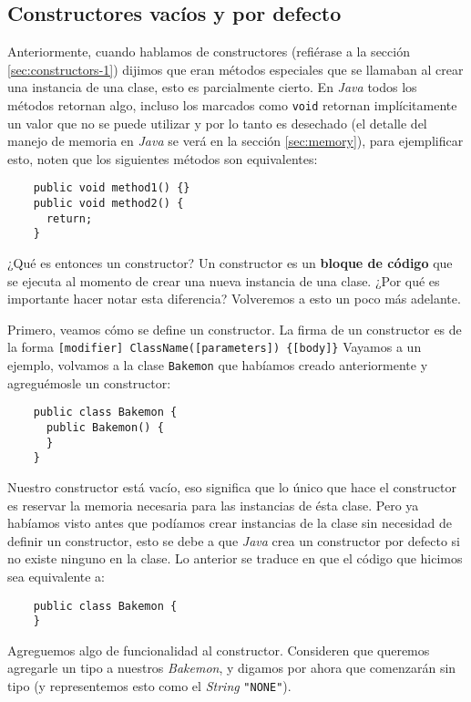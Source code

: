 \subsection{Constructores vacíos y por defecto}
  Anteriormente, cuando hablamos de constructores (refiérase a la sección 
  \ref{sec:constructors-1}) dijimos que eran métodos especiales que se llamaban al crear una 
  instancia de una clase, esto es parcialmente cierto.
  En \textit{Java} todos los métodos retornan algo, incluso los marcados como 
  \texttt{void} retornan implícitamente un valor que no se puede utilizar y por lo tanto
  es desechado (el detalle del manejo de memoria en \textit{Java} se verá en la sección 
  \ref{sec:memory}), para ejemplificar esto, noten que los siguientes métodos son equivalentes:
  
  \begin{verbatim}
    public void method1() {}
    public void method2() {
      return;
    }  
  \end{verbatim}

  ¿Qué es entonces un constructor?
  Un constructor es un \textbf{bloque de código} que se ejecuta al momento de crear una nueva 
  instancia de una clase.
  ¿Por qué es importante hacer notar esta diferencia?
  Volveremos a esto un poco más adelante.

  Primero, veamos cómo se define un constructor.
  La firma de un constructor es de la forma \texttt{[modifier] ClassName([parameters]) \{[body]\}}
  Vayamos a un ejemplo, volvamos a la clase \texttt{Bakemon} que habíamos creado anteriormente y 
  agreguémosle un constructor:
  
  \begin{verbatim}
    public class Bakemon {
      public Bakemon() {
      }
    }
  \end{verbatim}

  Nuestro constructor está vacío, eso significa que lo único que hace el constructor es reservar la 
  memoria necesaria para las instancias de ésta clase.
  Pero ya habíamos visto antes que podíamos crear instancias de la clase sin necesidad de definir un
  constructor, esto se debe a que \textit{Java} crea un constructor por defecto si no existe ninguno
  en la clase.
  Lo anterior se traduce en que el código que hicimos sea equivalente a:

  \begin{verbatim}
    public class Bakemon {
    }
  \end{verbatim}

  Agreguemos algo de funcionalidad al constructor.
  Consideren que queremos agregarle un tipo a nuestros \textit{Bakemon}, y digamos por ahora que 
  comenzarán sin tipo (y representemos esto como el \textit{String} \texttt{"NONE"}).


